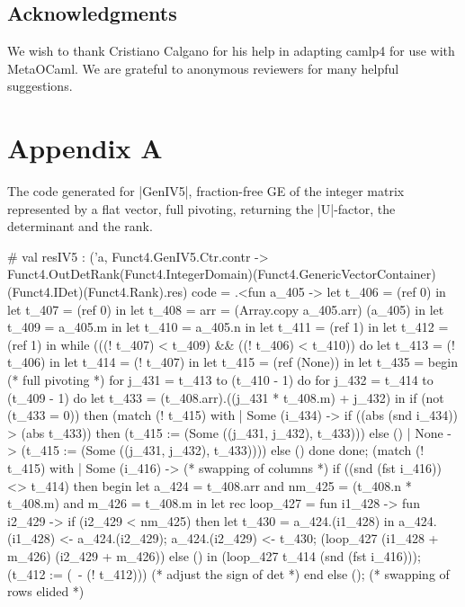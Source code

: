 \documentclass{llncs}
\begin{document}
\subsection*{Acknowledgments}
We wish to thank Cristiano Calgano for his help in adapting camlp4 for
use with MetaOCaml. We are grateful to anonymous reviewers for many
helpful suggestions.




\section{Appendix A}
The code generated for |GenIV5|, fraction-free GE of the integer matrix
represented by a flat vector, full pivoting, returning the |U|-factor,
the determinant and the rank.
\begin{code2}
# val resIV5 : ('a,
   Funct4.GenIV5.Ctr.contr ->
   Funct4.OutDetRank(Funct4.IntegerDomain)(Funct4.GenericVectorContainer)
                    (Funct4.IDet)(Funct4.Rank).res) code =
  .<fun a_405 ->
   let t_406 = (ref 0) in let t_407 = (ref 0) in
   let t_408 = {arr = (Array.copy a_405.arr)} (a_405) in
   let t_409 = a_405.m in let t_410 = a_405.n in
   let t_411 = (ref 1) in let t_412 = (ref 1) in
   while (((! t_407) < t_409) && ((! t_406) < t_410)) do
    let t_413 = (! t_406) in let t_414 = (! t_407) in
    let t_415 = (ref (None)) in
    let t_435 =
     begin  (* full pivoting *)
      for j_431 = t_413 to (t_410 - 1) do
       for j_432 = t_414 to (t_409 - 1) do
        let t_433 = (t_408.arr).((j_431 * t_408.m) + j_432) in
        if (not (t_433 = 0)) then
         (match (! t_415) with
          | Some (i_434) ->
             if ((abs (snd i_434)) > (abs t_433)) then
              (t_415 := (Some ((j_431, j_432), t_433))) else ()
          | None -> (t_415 := (Some ((j_431, j_432), t_433))))
        else ()
       done
      done;
      (match (! t_415) with
       | Some (i_416) ->  (* swapping of columns *)
          if ((snd (fst i_416)) <> t_414) then begin
           let a_424 = t_408.arr and nm_425 = (t_408.n * t_408.m)
           and m_426 = t_408.m in
           let rec loop_427 =
            fun i1_428 -> fun i2_429 ->
              if (i2_429 < nm_425) then
               let t_430 = a_424.(i1_428) in
               a_424.(i1_428) <- a_424.(i2_429);
               a_424.(i2_429) <- t_430;
               (loop_427 (i1_428 + m_426) (i2_429 + m_426))
              else () in
           (loop_427 t_414 (snd (fst i_416)));
           (t_412 := (~- (! t_412))) (* adjust the sign of det *)
          end else (); (* swapping of rows elided *)

\end{code2}
\end{document}
